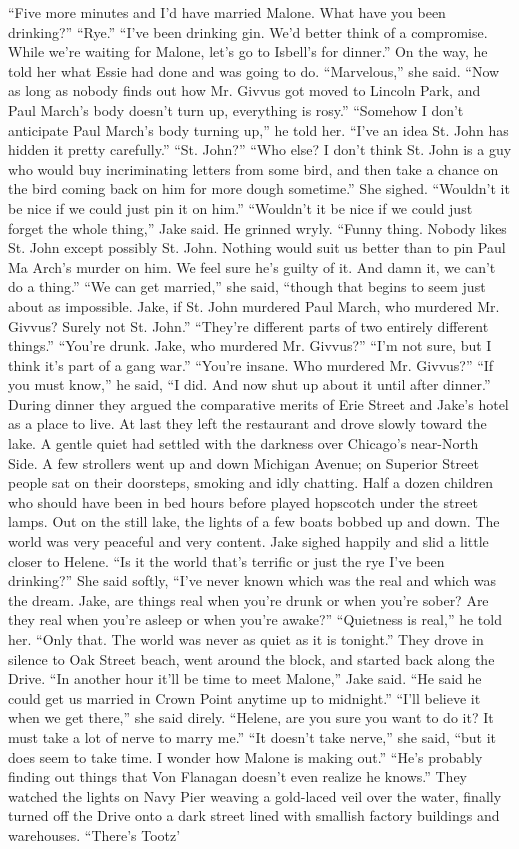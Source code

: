 \documentclass{novel}
\begin{document}
“Five more minutes and I’d have married Malone. What have you been drinking?” “Rye.” “I’ve been drinking gin. We’d better think of a compromise. While we’re waiting for Malone, let’s go to Isbell’s for dinner.” On the way, he told her what Essie had done and was going to do. “Marvelous,” she said. “Now as long as nobody finds out how Mr. Givvus got moved to Lincoln Park, and Paul March’s body doesn’t turn up, everything is rosy.” “Somehow I don’t anticipate Paul March’s body turning up,” he told her. “I’ve an idea St. John has hidden it pretty carefully.” “St. John?” “Who else? I don’t think St. John is a guy who would buy incriminating letters from some bird, and then take a chance on the bird coming back on him for more dough sometime.” She sighed. “Wouldn’t it be nice if we could just pin it on him.” “Wouldn’t it be nice if we could just forget the whole thing,” Jake said. He grinned wryly. “Funny thing. Nobody likes St. John except possibly St. John. Nothing would suit us better than to pin Paul Ma Arch’s murder on him. We feel sure he’s guilty of it. And damn it, we can’t do a thing.” “We can get married,” she said, “though that begins to seem just about as impossible. Jake, if St. John murdered Paul March, who murdered Mr. Givvus? Surely not St. John.” “They’re different parts of two entirely different things.” “You’re drunk. Jake, who murdered Mr. Givvus?” “I’m not sure, but I think it’s part of a gang war.” “You’re insane. Who murdered Mr. Givvus?” “If you must know,” he said, “I did. And now shut up about it until after dinner.” During dinner they argued the comparative merits of Erie Street and Jake’s hotel as a place to live. At last they left the restaurant and drove slowly toward the lake. A gentle quiet had settled with the darkness over Chicago’s near-North Side. A few strollers went up and down Michigan Avenue; on Superior Street people sat on their doorsteps, smoking and idly chatting. Half a dozen children who should have been in bed hours before played hopscotch under the street lamps. Out on the still lake, the lights of a few boats bobbed up and down. The world was very peaceful and very content. Jake sighed happily and slid a little closer to Helene. “Is it the world that’s terrific or just the rye I’ve been drinking?” She said softly, “I've never known which was the real and which was the dream. Jake, are things real when you’re drunk or when you’re sober? Are they real when you’re asleep or when you’re awake?” “Quietness is real,” he told her. “Only that. The world was never as quiet as it is tonight.” They drove in silence to Oak Street beach, went around the block, and started back along the Drive. “In another hour it’ll be time to meet Malone,” Jake said. “He said he could get us married in Crown Point anytime up to midnight.” “I’ll believe it when we get there,” she said direly. “Helene, are you sure you want to do it? It must take a lot of nerve to marry me.” “It doesn’t take nerve,” she said, “but it does seem to take time. I wonder how Malone is making out.” “He’s probably finding out things that Von Flanagan doesn’t even realize he knows.” They watched the lights on Navy Pier weaving a gold-laced veil over the water, finally turned off the Drive onto a dark street lined with smallish factory buildings and warehouses. “There’s Tootz’ 
\end{document}
